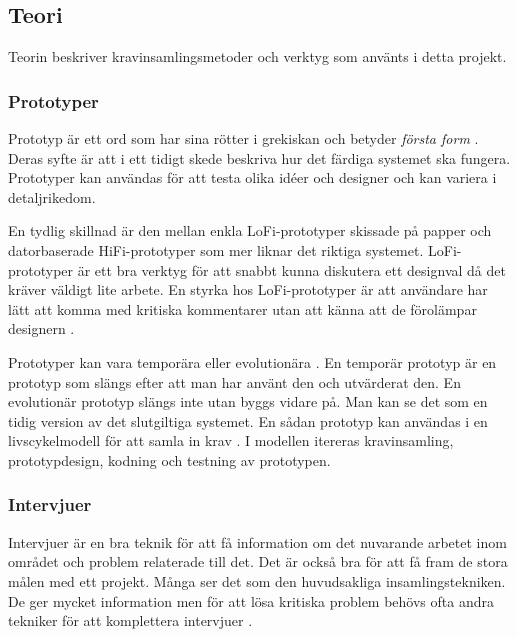 \subsection{Teori}
Teorin beskriver kravinsamlingsmetoder och  verktyg som använts i detta projekt. %

\subsubsection{Prototyper}
Prototyp är ett ord som har sina rötter i grekiskan och betyder \textit{första form} \cite{Arvola}. Deras syfte är att i ett tidigt skede beskriva hur det färdiga systemet ska fungera. Prototyper kan användas för att testa olika idéer och designer och kan variera i detaljrikedom. 

En tydlig skillnad är den mellan enkla LoFi-prototyper skissade på papper och datorbaserade HiFi-prototyper som mer liknar det riktiga systemet. LoFi-prototyper är ett bra verktyg för att snabbt kunna diskutera ett designval då det kräver väldigt lite arbete. En styrka hos LoFi-prototyper är att användare har lätt att komma med kritiska kommentarer utan att känna att de förolämpar designern \cite{Arvola}.

Prototyper kan vara temporära eller evolutionära \cite{Arvola}. En temporär prototyp är en prototyp som slängs efter att man har använt den och utvärderat den. En evolutionär prototyp slängs inte utan byggs vidare på. Man kan se det som en tidig version av det slutgiltiga systemet. En sådan prototyp kan användas i en livscykelmodell för att samla in krav \cite{Dorfman}. I modellen itereras kravinsamling, prototypdesign, kodning och testning av prototypen.

\subsubsection{Intervjuer}
Intervjuer är en bra teknik för att få information om det nuvarande arbetet inom området och problem relaterade till det. Det är också bra för att få fram de stora målen med ett projekt. Många ser det som den huvudsakliga insamlingstekniken. De ger mycket information men för att lösa kritiska problem behövs ofta andra tekniker för att komplettera intervjuer \cite{Lauesen}. 
